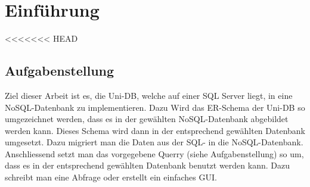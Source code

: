 \section{Einführung}
<<<<<<< HEAD

\subsection{Aufgabenstellung}
Ziel dieser Arbeit ist es, die Uni-DB, welche auf einer SQL Server liegt, in eine NoSQL-Datenbank zu implementieren. Dazu Wird das ER-Schema der Uni-DB so umgezeichnet werden, dass es in der gewählten NoSQL-Datenbank abgebildet werden kann. Dieses Schema wird dann in der entsprechend gewählten Datenbank umgesetzt. Dazu migriert man die Daten aus der SQL- in die NoSQL-Datenbank.
Anschliessend setzt man das vorgegebene Querry (siehe Aufgabenstellung) so um, dass es in der entsprechend gewählten Datenbank benutzt werden kann. Dazu schreibt man eine Abfrage oder erstellt ein einfaches GUI.

\newpage
